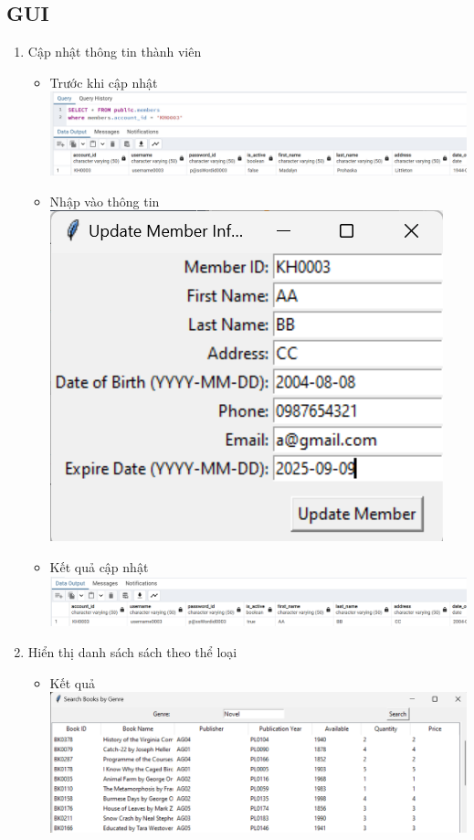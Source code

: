 \documentclass[12pt]{article}
\begin{document}
\subsection{GUI}
\begin{enumerate}
    \item Cập nhật thông tin thành viên
\begin{itemize}
    \item Trước khi cập nhật\\
\includegraphics[width=1\linewidth]{gui1.png}
\item Nhập vào thông tin\\
\includegraphics[width=0.3\linewidth]{gui2.png}
\item Kết quả cập nhật\\
\includegraphics[width=1\linewidth]{gui3.png}
\end{itemize}

    \item Hiển thị danh sách sách theo thể loại
\begin{itemize}
    \item Kết quả\\
\includegraphics[width=1\linewidth]{gui4.png}
\end{itemize}


\end{enumerate}
\end{document}

